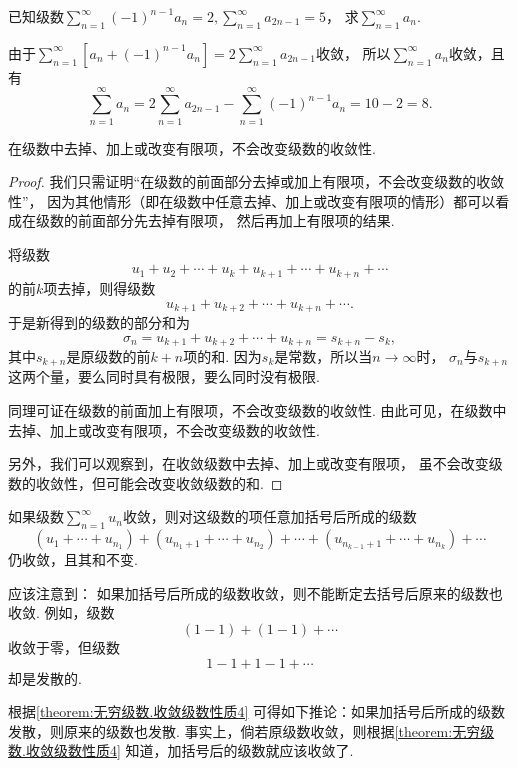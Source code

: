 \begin{example}
已知级数\(\sum\limits_{n=1}^\infty (-1)^{n-1} a_n = 2,
\sum\limits_{n=1}^\infty a_{2n-1} = 5\)，
求\(\sum\limits_{n=1}^\infty a_n\).
\begin{solution}
由于\(\sum\limits_{n=1}^\infty [a_n + (-1)^{n-1} a_n]
= 2 \sum\limits_{n=1}^\infty a_{2n-1}\)收敛，
所以\(\sum\limits_{n=1}^\infty a_n\)收敛，且有
\[
\sum\limits_{n=1}^\infty a_n
= 2 \sum\limits_{n=1}^\infty a_{2n-1}
- \sum\limits_{n=1}^\infty (-1)^{n-1} a_n
= 10 - 2 = 8.
\]
\end{solution}
\end{example}

\begin{property}\label{theorem:无穷级数.收敛级数性质3}
在级数中去掉、加上或改变有限项，不会改变级数的收敛性.
\begin{proof}
我们只需证明“在级数的前面部分去掉或加上有限项，不会改变级数的收敛性”，
因为其他情形（即在级数中任意去掉、加上或改变有限项的情形）都可以看成在级数的前面部分先去掉有限项，
然后再加上有限项的结果.

将级数\[
u_1+u_2+\dotsb+u_k+u_{k+1}+\dotsb+u_{k+n}+\dotsb
\]的前\(k\)项去掉，则得级数\[
u_{k+1}+u_{k+2}+\dotsb+u_{k+n}+\dotsb.
\]于是新得到的级数的部分和为\[
\sigma_n = u_{k+1}+u_{k+2}+\dotsb+u_{k+n} = s_{k+n} - s_k,
\]其中\(s_{k+n}\)是原级数的前\(k+n\)项的和.
因为\(s_k\)是常数，所以当\(n\to\infty\)时，
\(\sigma_n\)与\(s_{k+n}\)这两个量，要么同时具有极限，要么同时没有极限.

同理可证在级数的前面加上有限项，不会改变级数的收敛性.
由此可见，在级数中去掉、加上或改变有限项，不会改变级数的收敛性.

另外，我们可以观察到，在收敛级数中去掉、加上或改变有限项，
虽不会改变级数的收敛性，但可能会改变收敛级数的和.
\end{proof}
\end{property}

\begin{property}\label{theorem:无穷级数.收敛级数性质4}
如果级数\(\sum\limits_{n=1}^\infty u_n\)收敛，则对这级数的项任意加括号后所成的级数\[
(u_1+\dotsb+u_{n_1}) + (u_{n_1+1}+\dotsb+u_{n_2}) + \dotsb + (u_{n_{k-1}+1}+\dotsb+u_{n_k}) + \dotsb
\]仍收敛，且其和不变.
\end{property}

应该注意到：
如果加括号后所成的级数收敛，则不能断定去括号后原来的级数也收敛.
例如，级数\[
(1-1)+(1-1)+\dotsb
\]收敛于零，但级数\[
1-1+1-1+\dotsb
\]却是发散的.

根据\cref{theorem:无穷级数.收敛级数性质4} 可得如下推论：{\color{red}如果加括号后所成的级数发散，则原来的级数也发散.}
事实上，倘若原级数收敛，则根据\cref{theorem:无穷级数.收敛级数性质4} 知道，加括号后的级数就应该收敛了.

